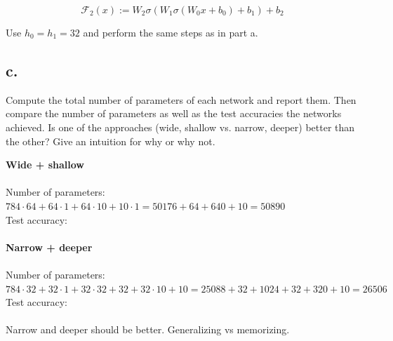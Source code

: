 \documentclass{article}
\newcommand{\1}{\mathbf{1}}
\begin{document}
{\[
    \mathcal{F}_2(x) := W_2 \sigma(W_1 \sigma(W_0 x + b_0) + b_1) + b_2
\]

Use $h_0 = h_1 = 32$ and perform the same steps as in part a.

\subsection*{c.}

Compute the total number of parameters of each network and report them. Then compare the number of parameters as well as the test accuracies the networks achieved. Is one of the approaches (wide, shallow vs. narrow, deeper) better than the other? Give
an intuition for why or why not.

\textbf{Wide + shallow} \\ \\
Number of parameters: $784 \cdot 64 + 64 \cdot 1 + 64 \cdot 10 + 10 \cdot 1 = 50176 + 64 + 640 + 10 = 50890$  \\
Test accuracy: \\ \\
\textbf{Narrow + deeper} \\ \\
Number of parameters: $784 \cdot 32 + 32 \cdot 1 + 32 \cdot 32 + 32 + 32 \cdot 10 + 10 = 25088 + 32 + 1024 + 32 + 320 + 10 = 26506$  \\
Test accuracy: \\ \\
Narrow and deeper should be better. Generalizing vs memorizing.

}
\end{document}
